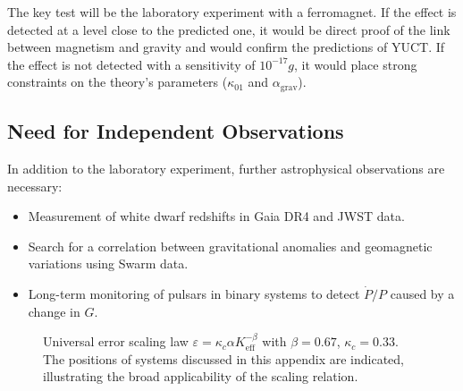 \documentclass[12pt]{article}
\theoremstyle{remark}
\newcommand{\Keff}{K_{\mathrm{eff}}}
\newcommand{\eps}{\varepsilon}
\newcommand{\kappac}{\kappa_c}
\begin{document}
	The key test will be the laboratory experiment with a ferromagnet. If the effect is detected at a level close to the predicted one, it would be direct proof of the link between magnetism and gravity and would confirm the predictions of YUCT. If the effect is not detected with a sensitivity of $10^{-17}g$, it would place strong constraints on the theory's parameters ($\kappa_{01}$ and $\alpha_{\text{grav}}$).
	
	\subsection{Need for Independent Observations}
	\label{subsec:discussion-independent}
	
	In addition to the laboratory experiment, further astrophysical observations are necessary:
	\begin{itemize}
		\item Measurement of white dwarf redshifts in Gaia DR4 and JWST data.
		\item Search for a correlation between gravitational anomalies and geomagnetic variations using Swarm data.
		\item Long-term monitoring of pulsars in binary systems to detect $\dot{P}/P$ caused by a change in $G$.
	\end{itemize}
	
	\begin{figure}[htbp]
		\centering
		\caption{Universal error scaling law $\eps = \kappac \alpha \Keff^{-\beta}$ with $\beta=0.67$, $\kappac=0.33$. The positions of systems discussed in this appendix are indicated, illustrating the broad applicability of the scaling relation.}
		\label{fig:scaling}
	\end{figure}
	
\end{document}
